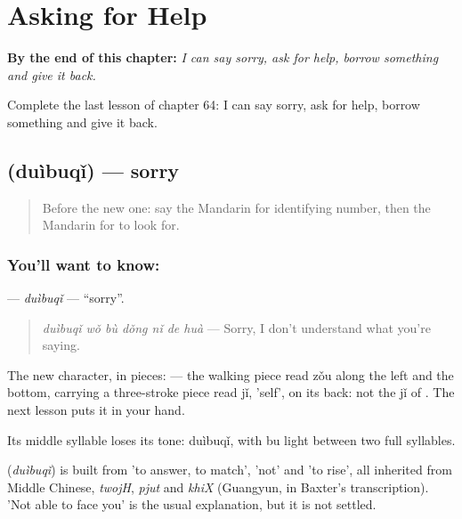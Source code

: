 
\chapter{Asking for Help}
\label{ch:zh-asking-for-help}

\begin{chapteropening}
\textbf{By the end of this chapter:} \emph{I can say sorry, ask for help, borrow something and give it back.}

Complete the last lesson of chapter 64: I can say sorry, ask for help, borrow something and give it back.
\end{chapteropening}

\section[\texorpdfstring{\zh{对不起} (duìbuqǐ)}{对不起 (duìbuqǐ)}]{ (duìbuqǐ) — sorry}

\label{lesson:ZH-C64-duibuqi}



\begin{quote}
Before the new one: say the Mandarin for identifying number, then the Mandarin for to look for.
\end{quote}

\subsection*{You'll want to know: }
\textbf{} — \emph{duìbuqǐ} — \textquotedblleft{}sorry\textquotedblright{}.

\begin{quote}
\emph{duìbuqǐ wǒ bù dǒng nǐ de huà} — Sorry, I don't understand what you're saying.
\end{quote}

The new character, in pieces:  — the walking piece read zǒu along the left and the bottom, carrying a three-stroke piece read jǐ, 'self', on its back: not the jǐ of . The next lesson puts it in your hand.

Its middle syllable loses its tone: duìbuqǐ, with bu light between two full syllables.

\begin{cousinweb}
\textbf{} (\emph{duìbuqǐ}) is built from  'to answer, to match',  'not' and  'to rise', all inherited from Middle Chinese, \emph{twojH}, \emph{pjut} and \emph{khiX} (Guangyun, in Baxter's transcription). 'Not able to face you' is the usual explanation, but it is not settled.
\end{cousinweb}

